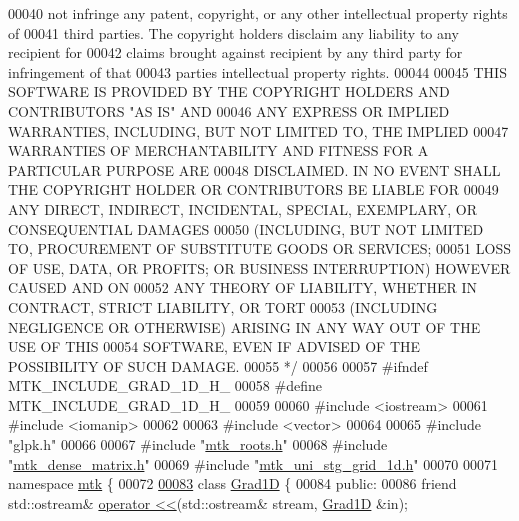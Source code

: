 \begin{DoxyCode}
00040 \textcolor{comment}{not infringe any patent, copyright, or any other intellectual property rights of}
00041 \textcolor{comment}{third parties. The copyright holders disclaim any liability to any recipient for}
00042 \textcolor{comment}{claims brought against recipient by any third party for infringement of that}
00043 \textcolor{comment}{parties intellectual property rights.}
00044 \textcolor{comment}{}
00045 \textcolor{comment}{THIS SOFTWARE IS PROVIDED BY THE COPYRIGHT HOLDERS AND CONTRIBUTORS "AS IS" AND}
00046 \textcolor{comment}{ANY EXPRESS OR IMPLIED WARRANTIES, INCLUDING, BUT NOT LIMITED TO, THE IMPLIED}
00047 \textcolor{comment}{WARRANTIES OF MERCHANTABILITY AND FITNESS FOR A PARTICULAR PURPOSE ARE}
00048 \textcolor{comment}{DISCLAIMED. IN NO EVENT SHALL THE COPYRIGHT HOLDER OR CONTRIBUTORS BE LIABLE FOR}
00049 \textcolor{comment}{ANY DIRECT, INDIRECT, INCIDENTAL, SPECIAL, EXEMPLARY, OR CONSEQUENTIAL DAMAGES}
00050 \textcolor{comment}{(INCLUDING, BUT NOT LIMITED TO, PROCUREMENT OF SUBSTITUTE GOODS OR SERVICES;}
00051 \textcolor{comment}{LOSS OF USE, DATA, OR PROFITS; OR BUSINESS INTERRUPTION) HOWEVER CAUSED AND ON}
00052 \textcolor{comment}{ANY THEORY OF LIABILITY, WHETHER IN CONTRACT, STRICT LIABILITY, OR TORT}
00053 \textcolor{comment}{(INCLUDING NEGLIGENCE OR OTHERWISE) ARISING IN ANY WAY OUT OF THE USE OF THIS}
00054 \textcolor{comment}{SOFTWARE, EVEN IF ADVISED OF THE POSSIBILITY OF SUCH DAMAGE.}
00055 \textcolor{comment}{*/}
00056 
00057 \textcolor{preprocessor}{#ifndef MTK\_INCLUDE\_GRAD\_1D\_H\_}
00058 \textcolor{preprocessor}{#define MTK\_INCLUDE\_GRAD\_1D\_H\_}
00059 
00060 \textcolor{preprocessor}{#include <iostream>}
00061 \textcolor{preprocessor}{#include <iomanip>}
00062 
00063 \textcolor{preprocessor}{#include <vector>}
00064 
00065 \textcolor{preprocessor}{#include "glpk.h"}
00066 
00067 \textcolor{preprocessor}{#include "\hyperlink{mtk__roots_8h}{mtk\_roots.h}"}
00068 \textcolor{preprocessor}{#include "\hyperlink{mtk__dense__matrix_8h}{mtk\_dense\_matrix.h}"}
00069 \textcolor{preprocessor}{#include "\hyperlink{mtk__uni__stg__grid__1d_8h}{mtk\_uni\_stg\_grid\_1d.h}"}
00070 
00071 \textcolor{keyword}{namespace }\hyperlink{namespacemtk}{mtk} \{
00072 
\hypertarget{mtk__grad__1d_8h_source_l00083}{}\hyperlink{classmtk_1_1Grad1D}{00083} \textcolor{keyword}{class }\hyperlink{classmtk_1_1Grad1D}{Grad1D} \{
00084  \textcolor{keyword}{public}:
00086   \textcolor{keyword}{friend} std::ostream& \hyperlink{classmtk_1_1Grad1D_aeba97883d95c0b4546a98bebe8ef3106}{operator <<}(std::ostream& stream, \hyperlink{classmtk_1_1Grad1D}{Grad1D} &in);

\end{DoxyCode}
